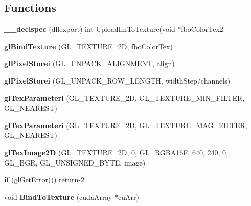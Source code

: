 \subsection*{Functions}
\begin{DoxyCompactItemize}
\item 
{\bfseries \+\_\+\+\_\+declspec} (dllexport) int Upload\+Im\+To\+Texture(void $\ast$fbo\+Color\+Tex2\label{likelihood_8cpp_addb9492cbf8b49028bd70ecd95524d5b}

\item 
{\bfseries gl\+Bind\+Texture} (G\+L\+\_\+\+T\+E\+X\+T\+U\+R\+E\+\_\+2D, fbo\+Color\+Tex)\label{likelihood_8cpp_afdcb72a6b50ba4e13f1de388cf45fc9a}

\item 
{\bfseries gl\+Pixel\+Storei} (G\+L\+\_\+\+U\+N\+P\+A\+C\+K\+\_\+\+A\+L\+I\+G\+N\+M\+E\+NT, align)\label{likelihood_8cpp_af8dc69a917ec05f425e15fd9009e5c56}

\item 
{\bfseries gl\+Pixel\+Storei} (G\+L\+\_\+\+U\+N\+P\+A\+C\+K\+\_\+\+R\+O\+W\+\_\+\+L\+E\+N\+G\+TH, width\+Step/channels)\label{likelihood_8cpp_a42dbb4feedfcd0b5e6403f8b9c02b7eb}

\item 
{\bfseries gl\+Tex\+Parameteri} (G\+L\+\_\+\+T\+E\+X\+T\+U\+R\+E\+\_\+2D, G\+L\+\_\+\+T\+E\+X\+T\+U\+R\+E\+\_\+\+M\+I\+N\+\_\+\+F\+I\+L\+T\+ER, G\+L\+\_\+\+N\+E\+A\+R\+E\+ST)\label{likelihood_8cpp_a97aea50763405389148f926dba880e86}

\item 
{\bfseries gl\+Tex\+Parameteri} (G\+L\+\_\+\+T\+E\+X\+T\+U\+R\+E\+\_\+2D, G\+L\+\_\+\+T\+E\+X\+T\+U\+R\+E\+\_\+\+M\+A\+G\+\_\+\+F\+I\+L\+T\+ER, G\+L\+\_\+\+N\+E\+A\+R\+E\+ST)\label{likelihood_8cpp_ad108eb61e678ec606443a5024256bc04}

\item 
{\bfseries gl\+Tex\+Image2D} (G\+L\+\_\+\+T\+E\+X\+T\+U\+R\+E\+\_\+2D, 0, G\+L\+\_\+\+R\+G\+B\+A16F, 640, 240, 0, G\+L\+\_\+\+B\+GR, G\+L\+\_\+\+U\+N\+S\+I\+G\+N\+E\+D\+\_\+\+B\+Y\+TE, image)\label{likelihood_8cpp_a52f6c6cbefa2a16ad9fa6c4645fb9f23}

\item 
{\bfseries if} (gl\+Get\+Error()) return-\/2\label{likelihood_8cpp_a39b284aca13da1d997182d6f3dfcf647}

\item 
void {\bfseries Bind\+To\+Texture} (cuda\+Array $\ast$cu\+Arr)\label{likelihood_8cpp_a13bdf562e1a8c134961c097978b6ad40}


\end{DoxyCompactItemize}
